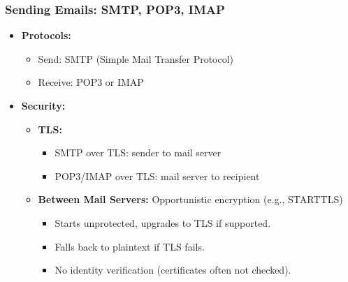 \subsubsection{Sending Emails: SMTP, POP3, IMAP}
\begin{itemize}
    \item \textbf{Protocols:}
    \begin{itemize}
        \item Send: SMTP (Simple Mail Transfer Protocol)
        \item Receive: POP3 or IMAP
    \end{itemize}
    \item \textbf{Security:}
    \begin{itemize}
        \item \textbf{TLS:} 
        \begin{itemize}
            \item SMTP over TLS: sender to mail server
            \item POP3/IMAP over TLS: mail server to recipient
        \end{itemize}
        \item \textbf{Between Mail Servers:} Opportunistic encryption (e.g., STARTTLS)
        \begin{itemize}
            \item Starts unprotected, upgrades to TLS if supported.
            \item Falls back to plaintext if TLS fails.
            \item No identity verification (certificates often not checked).
        \end{itemize}
    \end{itemize}
\end{itemize}

